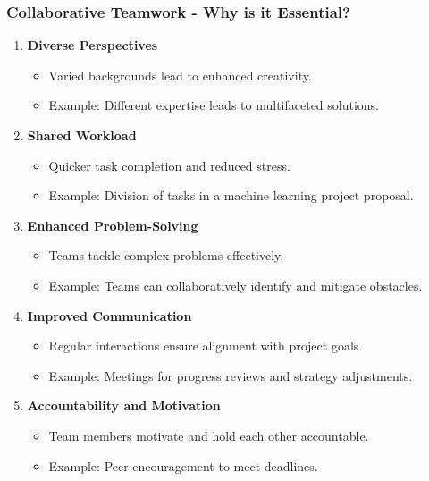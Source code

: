 \documentclass[aspectratio=169]{beamer}
\begin{document}
\begin{frame}[fragile]
    \frametitle{Collaborative Teamwork - Why is it Essential?}
    \begin{enumerate}
        \item \textbf{Diverse Perspectives}
            \begin{itemize}
                \item Varied backgrounds lead to enhanced creativity.
                \item Example: Different expertise leads to multifaceted solutions.
            \end{itemize}
        \item \textbf{Shared Workload}
            \begin{itemize}
                \item Quicker task completion and reduced stress.
                \item Example: Division of tasks in a machine learning project proposal.
            \end{itemize}
        \item \textbf{Enhanced Problem-Solving}
            \begin{itemize}
                \item Teams tackle complex problems effectively.
                \item Example: Teams can collaboratively identify and mitigate obstacles.
            \end{itemize}
        \item \textbf{Improved Communication}
            \begin{itemize}
                \item Regular interactions ensure alignment with project goals.
                \item Example: Meetings for progress reviews and strategy adjustments.
            \end{itemize}
        \item \textbf{Accountability and Motivation}
            \begin{itemize}
                \item Team members motivate and hold each other accountable.
                \item Example: Peer encouragement to meet deadlines.
            \end{itemize}
    \end{enumerate}
\end{frame}
\end{document}
